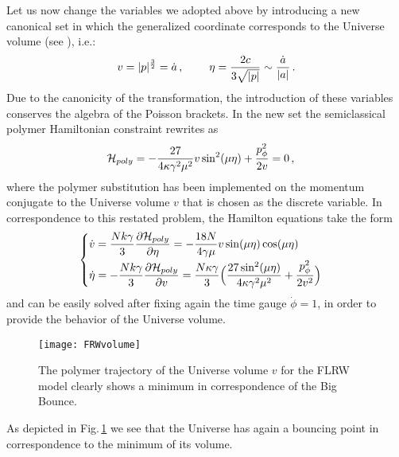 \documentclass[aps,prd,twocolumn,nofootinbib,superscriptaddress]{revtex4-2}
\begin{document}
Let us now change the variables we adopted above by introducing a new canonical set in which the generalized coordinate corresponds to the Universe volume (see \cite{EFG}), i.e.:
\begin{equation}
	v=|p|^{3\over2}=\dot a\,, \hspace{0.8cm}\eta={2c\over 3 \sqrt{|p|}}\sim{\dot a\over |a|}\,.
\end{equation}
Due to the canonicity of the transformation, the introduction of these variables conserves the algebra of the Poisson brackets. In the new set the semiclassical polymer Hamiltonian constraint rewrites as		
\begin{align}
	&\mathcal{H}_{poly}=-{27\over 4\kappa \gamma^{2}\mu^{2}}v\sin^2(\mu\eta)+{p_{\phi}^{2}\over 2v}=0\,,
\end{align}
where the polymer substitution has been implemented on the momentum conjugate to the Universe volume $v$ that is chosen as the discrete variable. In correspondence to this restated problem, the Hamilton equations take the form
\begin{equation}
		\label{eqn:FRWvolume}
	\begin{cases}
\begin{aligned}
	&\dot{v}={Nk\gamma\over3}{{\partial \mathcal{H}_{poly}}\over{\partial \eta}}=-{18N\over 4\gamma\mu}v\sin(\mu \eta)\cos(\mu \eta)\\
	&\dot{\eta}=-{Nk\gamma\over3}{{\partial \mathcal{H}_{poly}}\over{\partial v}}={N\kappa\gamma\over 3}\Big({27\sin^{2}(\mu \eta)\over{4\kappa\gamma^{2}\mu^{2}}}+{p_\phi^{2}\over 2v^{2}}\Big)
\end{aligned}
\end{cases}
\end{equation}
and can be easily solved after fixing again the time gauge $\dot{\phi}=1$, in order to provide the behavior of the Universe volume. 
\begin{figure}[h!]
	\centering
	\texttt{[image: FRWvolume]}
	\caption{The polymer trajectory of the Universe volume $v$ for the FLRW model clearly shows a minimum in correspondence of the Big Bounce.}
	\label{FRWvolume}
\end{figure}

As depicted in Fig.$\,$\ref{FRWvolume} we see that the Universe has again a bouncing point in correspondence to the minimum of its volume.
\end{document}

